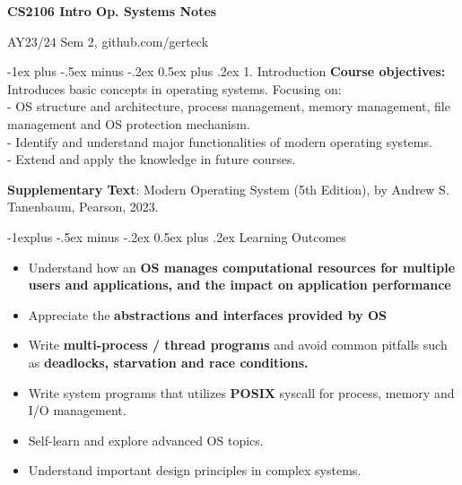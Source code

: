 \documentclass[10pt, landscape]{article}
\makeatletter
\renewcommand{\section}{\@startsection{section}{1}{0mm}%
                                {-1ex plus -.5ex minus -.2ex}%
                                {0.5ex plus .2ex}%
                                {\normalfont\large\bfseries}}
\renewcommand{\subsection}{\@startsection{subsection}{2}{0mm}%
                                {-1explus -.5ex minus -.2ex}%
                                {0.5ex plus .2ex}%
                                {\normalfont\normalsize\bfseries}}
\makeatother
\begin{document}
\raggedright
\footnotesize
\begin{multicols*}{3}

\setlength{\premulticols}{1pt}
\setlength{\postmulticols}{1pt}
\setlength{\multicolsep}{1pt}
\setlength{\columnsep}{2pt}

\begin{center}
     \Large{\textbf{CS2106 Intro Op. Systems Notes}} \\
\end{center}
AY23/24 Sem 2, github.com/gerteck


\section{1. Introduction}
\textbf{Course objectives:} Introduces basic concepts in operating systems. Focusing on: \\
- OS structure and architecture, process management, memory management, file management and OS protection mechanism. \\
- Identify and understand major functionalities of modern operating systems. \\
- Extend and apply the knowledge in future courses.

\textbf{Supplementary Text}: Modern Operating System (5th Edition), by Andrew S. Tanenbaum, Pearson, 2023.

\subsection{Learning Outcomes}
\begin{itemize}
	\item Understand how an \textbf{OS manages computational resources for multiple users and applications, and the impact on application performance}
	\item Appreciate the \textbf{abstractions and interfaces provided by OS}
	\item Write \textbf{multi-process / thread programs} and avoid common pitfalls such as \textbf{deadlocks, starvation and race conditions.}
	\item Write system programs that utilizes \textbf{POSIX} syscall for process, memory and I/O management.
	\item Self-learn and explore advanced OS topics.
	\item Understand important design principles in complex systems.
\end{itemize}


\end{multicols*}
\end{document}
